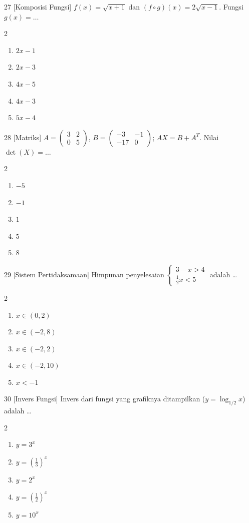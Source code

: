 \documentclass[11pt]{article}
\newenvironment{pilB}{%
  \par\smallskip\begin{multicols}{2}
  \begin{enumerate}[label=(\alph*),leftmargin=*,itemsep=1pt,topsep=3pt]}%
  {\end{enumerate}\end{multicols}}
\begin{document}
\begin{soal}{27 \normalfont\small[Komposisi Fungsi]}
$f(x)=\sqrt{x+1}$ dan $(f\circ g)(x)=2\sqrt{x-1}$. Fungsi $g(x)=\ldots$
\begin{pilB}
  \item $2x-1$ \item $2x-3$ \item $4x-5$ \item $4x-3$ \item $5x-4$
\end{pilB}
\end{soal}

\begin{soal}{28 \normalfont\small[Matriks]}
$A=\begin{pmatrix}3&2\\0&5\end{pmatrix}$, $B=\begin{pmatrix}-3&-1\\-17&0\end{pmatrix}$; $AX=B+A^T$.
Nilai $\det(X)=\ldots$
\begin{pilB}
  \item $-5$ \item $-1$ \item $1$ \item $5$ \item $8$
\end{pilB}
\end{soal}

\begin{soal}{29 \normalfont\small[Sistem Pertidaksamaan]}
Himpunan penyelesaian $\begin{cases}3-x>4\\\frac12x<5\end{cases}$ adalah \ldots
\begin{pilB}
  \item $x\in(0,2)$ \item $x\in(-2,8)$ \item $x\in(-2,2)$ \item $x\in(-2,10)$ \item $x<-1$
\end{pilB}
\end{soal}

\begin{soal}{30 \normalfont\small[Invers Fungsi]}
Invers dari fungsi yang grafiknya ditampilkan ($y=\log_{1/2}x$) adalah \ldots
\begin{pilB}
  \item $y=3^x$ \item $y=(\tfrac13)^x$ \item $y=2^x$ \item $y=(\tfrac12)^x$ \item $y=10^x$
\end{pilB}
\end{soal}
\end{document}
